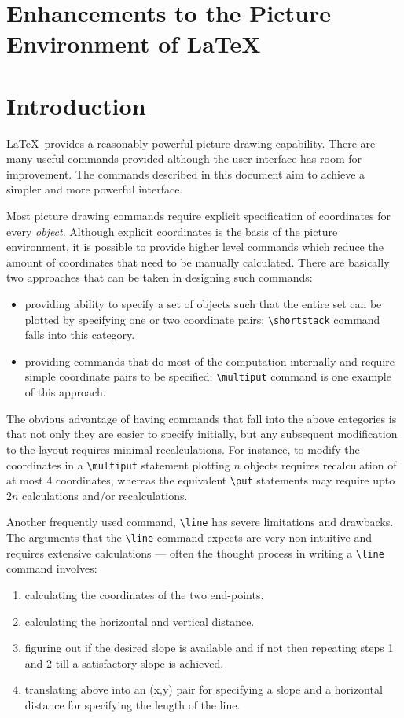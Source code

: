 \newpage
\setcounter{page}{1}
\section*{Enhancements to the Picture Environment of \LaTeX}

\bigskip
\section{Introduction}


\LaTeX\ provides a reasonably powerful picture drawing capability.
There are many useful commands provided although the
user-interface has room for improvement. The commands described
in this document aim to achieve a simpler and more powerful interface.

Most picture drawing commands require explicit specification of coordinates
for every {\it object\/}. Although explicit coordinates is the basis of the
picture environment, it is possible to provide higher level commands which
reduce the amount of coordinates that need to be manually calculated. There
are basically two approaches that can be taken in designing such commands:
%
\begin{itemize}
\item providing ability to specify a set of objects such that
the entire set can be plotted by specifying one or two coordinate pairs;
\verb|\shortstack| command falls into this category.

\item providing commands that do most of the computation internally and
require simple coordinate pairs to be specified; \verb|\multiput| command is
one example of this approach.

\end{itemize}

The obvious advantage of having commands that fall into the above categories
is that not only they are easier to specify initially, but any subsequent
modification to the layout requires minimal recalculations. For instance, to
modify the coordinates in a \verb|\multiput| statement plotting $n$ objects
requires recalculation of at most 4 coordinates, whereas the equivalent
\verb|\put| statements may require upto $2n$ calculations and/or
recalculations.

Another frequently used command, \verb|\line| has severe limitations and
drawbacks. The
arguments that the \verb|\line| command expects are very non-intuitive and
requires extensive calculations --- often the thought process in writing a
\verb|\line| command involves:
\begin{enumerate}
\item calculating the coordinates of the two end-points.
\item calculating the horizontal and vertical distance.
\item figuring out if the desired slope is available and if not then
repeating steps 1 and 2 till a satisfactory slope is achieved.
\item translating above into an (x,y) pair for specifying a slope and a
horizontal distance for specifying the length of the line.
\end{enumerate}

